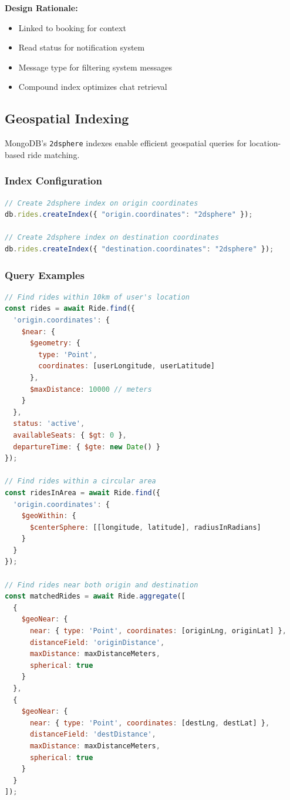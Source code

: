 \documentclass[12pt,a4paper]{article}
\begin{document}
\textbf{Design Rationale:}
\begin{itemize}
    \item Linked to booking for context
    \item Read status for notification system
    \item Message type for filtering system messages
    \item Compound index optimizes chat retrieval
\end{itemize}

\subsection{Geospatial Indexing}

MongoDB's \texttt{2dsphere} indexes enable efficient geospatial queries for location-based ride matching.

\subsubsection{Index Configuration}
\begin{lstlisting}[language=JavaScript, caption=Geospatial Index Setup]
// Create 2dsphere index on origin coordinates
db.rides.createIndex({ "origin.coordinates": "2dsphere" });

// Create 2dsphere index on destination coordinates
db.rides.createIndex({ "destination.coordinates": "2dsphere" });
\end{lstlisting}

\subsubsection{Query Examples}
\begin{lstlisting}[language=JavaScript, caption=Geospatial Query Operations]
// Find rides within 10km of user's location
const rides = await Ride.find({
  'origin.coordinates': {
    $near: {
      $geometry: {
        type: 'Point',
        coordinates: [userLongitude, userLatitude]
      },
      $maxDistance: 10000 // meters
    }
  },
  status: 'active',
  availableSeats: { $gt: 0 },
  departureTime: { $gte: new Date() }
});

// Find rides within a circular area
const ridesInArea = await Ride.find({
  'origin.coordinates': {
    $geoWithin: {
      $centerSphere: [[longitude, latitude], radiusInRadians]
    }
  }
});

// Find rides near both origin and destination
const matchedRides = await Ride.aggregate([
  {
    $geoNear: {
      near: { type: 'Point', coordinates: [originLng, originLat] },
      distanceField: 'originDistance',
      maxDistance: maxDistanceMeters,
      spherical: true
    }
  },
  {
    $geoNear: {
      near: { type: 'Point', coordinates: [destLng, destLat] },
      distanceField: 'destDistance',
      maxDistance: maxDistanceMeters,
      spherical: true
    }
  }
]);
\end{lstlisting}
\end{document}

